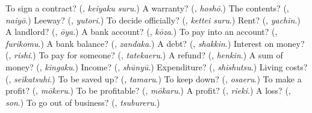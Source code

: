 \begin{tcolorbox}[breakable,colback=teal!4,colframe=teal!35!black,title={Before you move on}]
To sign a contract? (\textbf{}, \emph{keiyaku suru}.) A warranty? (\textbf{}, \emph{hoshō}.) The contents? (\textbf{}, \emph{naiyō}.) Leeway? (\textbf{}, \emph{yutori}.) To decide officially? (\textbf{}, \emph{kettei suru}.) Rent? (\textbf{}, \emph{yachin}.) A landlord? (\textbf{}, \emph{ōya}.) A bank account? (\textbf{}, \emph{kōza}.) To pay into an account? (\textbf{}, \emph{furikomu}.) A bank balance? (\textbf{}, \emph{zandaka}.) A debt? (\textbf{}, \emph{shakkin}.) Interest on money? (\textbf{}, \emph{rishi}.) To pay for someone? (\textbf{}, \emph{tatekaeru}.) A refund? (\textbf{}, \emph{henkin}.) A sum of money? (\textbf{}, \emph{kingaku}.) Income? (\textbf{}, \emph{shūnyū}.) Expenditure? (\textbf{}, \emph{shishutsu}.) Living costs? (\textbf{}, \emph{seikatsuhi}.) To be saved up? (\textbf{}, \emph{tamaru}.) To keep down? (\textbf{}, \emph{osaeru}.) To make a profit? (\textbf{}, \emph{mōkeru}.) To be profitable? (\textbf{}, \emph{mōkaru}.) A profit? (\textbf{}, \emph{rieki}.) A loss? (\textbf{}, \emph{son}.) To go out of business? (\textbf{}, \emph{tsubureru}.)
\end{tcolorbox}
